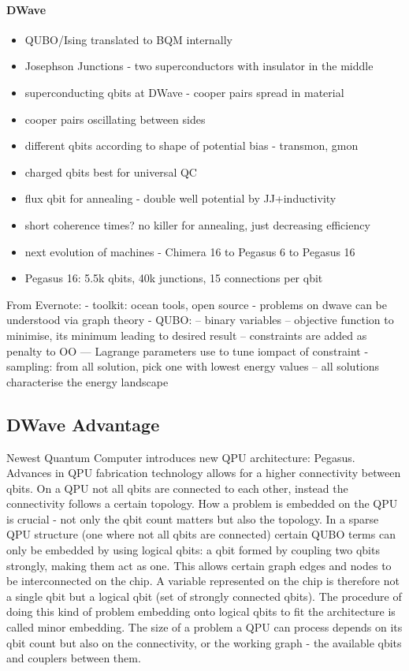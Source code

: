 \paragraph{DWave}
\begin{itemize}
  \item QUBO/Ising translated to BQM internally
  \item Josephson Junctions - two superconductors with insulator in the middle
  \item superconducting qbits at DWave - cooper pairs spread in material
  \item cooper pairs oscillating between sides
  \item different qbits according to shape of potential bias - transmon, gmon
  \item charged qbits best for universal QC
  \item flux qbit for annealing - double well potential by JJ+inductivity
  \item short coherence times? no killer for annealing, just decreasing efficiency
  \item next evolution of machines - Chimera 16 to Pegasus 6 to Pegasus 16
  \item Pegasus 16: 5.5k qbits, 40k junctions, 15 connections per qbit
\end{itemize}

From Evernote:
- toolkit: ocean tools, open source
- problems on dwave can be understood via graph theory
- QUBO:
-- binary variables
-- objective function to minimise, its minimum leading to desired result
-- constraints are added as penalty to OO
--- Lagrange parameters use to tune iompact of constraint
- sampling: from all solution, pick one with lowest energy values
-- all solutions characterise the energy landscape


\subsection{DWave Advantage}
Newest Quantum Computer introduces new QPU architecture: Pegasus. Advances in
QPU fabrication technology allows for a higher connectivity between qbits. On a
QPU not all qbits are connected to each other, instead the connectivity follows
a certain topology. How a problem is embedded on the QPU is crucial - not only
the qbit count matters but also the topology. In a sparse QPU structure (one
where not all qbits are connected) certain QUBO terms can only be embedded by
using logical qbits: a qbit formed by coupling two qbits strongly, making them
act as one. This allows certain graph edges and nodes to be interconnected on
the chip. A variable represented on the chip is therefore not a single qbit but
a logical qbit (set of strongly connected qbits). The procedure of doing this
kind of problem embedding onto logical qbits to fit the architecture is called
minor embedding.
The size of a problem a QPU can process depends on its qbit count but also on
the connectivity, or the working graph - the available qbits and couplers
between them.

